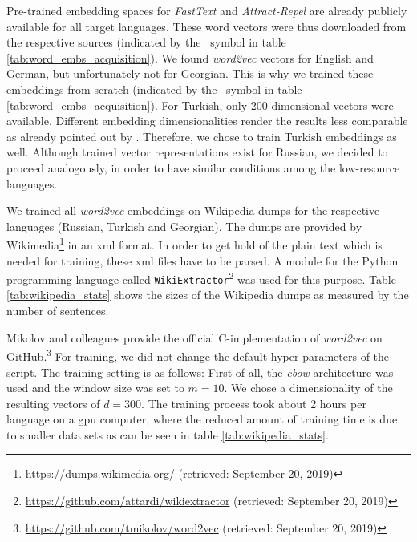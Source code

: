 \vspace*{2mm}

\vspace*{2mm}
 
 Pre-trained embedding spaces for \textit{FastText} and \textit{Attract-Repel} are already publicly available for all target languages. These word vectors were thus downloaded from the respective sources (indicated by the \faDownload\ symbol in table \vref{tab:word_embs_acquisition}). We found \textit{word2vec} vectors for English and German, but unfortunately not for Georgian. This is why we trained these embeddings from scratch (indicated by the \faCogs\ symbol in table \vref{tab:word_embs_acquisition}). For Turkish, only 200-dimensional vectors were available. Different embedding dimensionalities render the results less comparable as already pointed out by \citep{Eger.2019}. Therefore, we chose to train Turkish embeddings as well. Although trained vector representations exist for Russian, we decided to proceed analogously, in order to have similar conditions among the low-resource languages.

 We trained all \textit{word2vec} embeddings on Wikipedia dumps for the respective languages (Russian, Turkish and Georgian). The dumps are provided by Wikimedia\footnote{\url{https://dumps.wikimedia.org/} (retrieved: September 20, 2019)} in an \gls{xml} format. In order to get hold of the plain text which is needed for training, these \gls{xml} files have to be parsed. A module for the Python programming language called  \texttt{WikiExtractor}\footnote{\url{https://github.com/attardi/wikiextractor} (retrieved: September 20, 2019)} was used for this purpose. Table \vref{tab:wikipedia_stats} shows the sizes of the Wikipedia dumps as measured by the number of sentences.

Mikolov and colleagues provide the official C-implementation of \textit{word2vec} on GitHub\github.\footnote{\url{https://github.com/tmikolov/word2vec} (retrieved: September 20, 2019)} For training, we did not change the default hyper-parameters of the script. The training setting is as follows: First of all, the \textit{\gls{cbow}} architecture was used and the window size was set to $m = 10$. We chose a dimensionality of the resulting vectors of $d = 300$. The training process took about 2 hours per language on a \gls{gpu} computer, where the reduced amount of training time is due to smaller data sets as can be seen in table \vref{tab:wikipedia_stats}.

